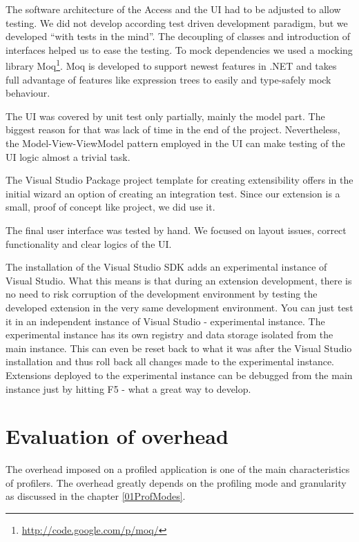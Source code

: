 The software architecture of the Access and the UI had to be adjusted to allow testing. We did not develop according test driven development paradigm, but we developed ``with tests in the mind''. The decoupling of classes and introduction of interfaces helped us to ease the testing. To mock dependencies we used a mocking library Moq\footnote{ \href{http://code.google.com/p/moq/}{http://code.google.com/p/moq/}}. Moq is developed to support newest features in .NET and takes full advantage of features like expression trees to easily and type-safely mock behaviour. 

The UI was covered by unit test only partially, mainly the model part. The biggest reason for that was lack of time in the end of the project. Nevertheless, the Model-View-ViewModel pattern employed in the UI can make testing of the UI logic almost a trivial task. 

The Visual Studio Package project template for creating extensibility offers in the initial wizard an option of creating an integration test. Since our extension is a small, proof of concept like project, we did use it. 

The final user interface was tested by hand. We focused on layout issues, correct functionality and clear logics of the UI.

The installation of the Visual Studio SDK adds an experimental instance of Visual Studio. What this means is that during an extension development, there is no need to risk corruption of the development environment by testing the developed extension in the very same development environment. You can just test it in an independent instance of Visual Studio - experimental instance. The experimental instance has its own registry and data storage isolated from the main instance. This can even be reset back to what it was after the Visual Studio installation and thus roll back all changes made to the experimental instance. Extensions deployed to the experimental instance can be debugged from the main instance just by hitting F5 - what a great way to develop. 



\section{Evaluation of overhead}
The overhead imposed on a profiled application is one of the main characteristics of profilers. The overhead greatly depends on the profiling mode and granularity as discussed in the chapter \ref{01ProfModes}.

